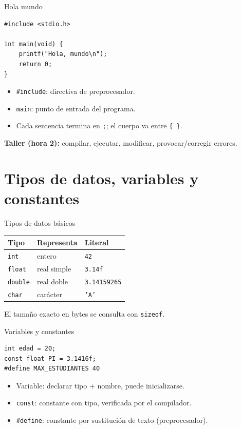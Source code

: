 \documentclass[11pt]{beamer}
\begin{document}
\begin{frame}[fragile]{Hola mundo}
\begin{lstlisting}
#include <stdio.h>

int main(void) {
    printf("Hola, mundo\n");
    return 0;
}
\end{lstlisting}
  \begin{itemize}
    \item \texttt{\#include}: directiva de preprocesador.
    \item \texttt{main}: punto de entrada del programa.
    \item Cada sentencia termina en \texttt{;}; el cuerpo va entre \texttt{\{ \}}.
  \end{itemize}
  \vfill
  \textbf{Taller (hora 2):} compilar, ejecutar, modificar, provocar/corregir errores.
\end{frame}

\section{Tipos de datos, variables y constantes}

\begin{frame}{Tipos de datos básicos}
  \begin{center}
  \begin{tabular}{lll}
    \textbf{Tipo} & \textbf{Representa} & \textbf{Literal} \\ \hline
    \texttt{int} & entero & \texttt{42} \\
    \texttt{float} & real simple & \texttt{3.14f} \\
    \texttt{double} & real doble & \texttt{3.14159265} \\
    \texttt{char} & carácter & \texttt{'A'} \\
  \end{tabular}
  \end{center}
  \vfill
  El tamaño exacto en bytes se consulta con \texttt{sizeof}.
\end{frame}

\begin{frame}[fragile]{Variables y constantes}
\begin{lstlisting}
int edad = 20;
const float PI = 3.1416f;
#define MAX_ESTUDIANTES 40
\end{lstlisting}
  \begin{itemize}
    \item Variable: declarar tipo + nombre, puede inicializarse.
    \item \texttt{const}: constante con tipo, verificada por el compilador.
    \item \texttt{\#define}: constante por sustitución de texto (preprocesador).
  \end{itemize}
\end{frame}
\end{document}
